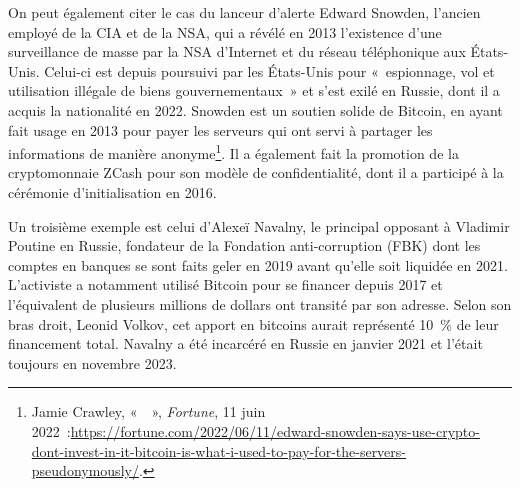 On peut également citer le cas du lanceur d'alerte Edward Snowden, l'ancien employé de la CIA et de la NSA, qui a révélé en 2013 l'existence d'une surveillance de masse par la NSA d'Internet et du réseau téléphonique aux États-Unis. Celui-ci est depuis poursuivi par les États-Unis pour «~espionnage, vol et utilisation illégale de biens gouvernementaux~» et s'est exilé en Russie, dont il a acquis la nationalité en 2022. Snowden est un soutien solide de Bitcoin, en ayant fait usage en 2013 pour payer les serveurs qui ont servi à partager les informations de manière anonyme\footnote{Jamie Crawley, «~~», \emph{Fortune}, 11 juin 2022~:\url{https://fortune.com/2022/06/11/edward-snowden-says-use-crypto-dont-invest-in-it-bitcoin-is-what-i-used-to-pay-for-the-servers-pseudonymously/}.}. Il a également fait la promotion de la cryptomonnaie ZCash pour son modèle de confidentialité, dont il a participé à la cérémonie d'initialisation en 2016.

Un troisième exemple est celui d'Alexeï Navalny, le principal opposant à Vladimir Poutine en Russie, fondateur de la Fondation anti-corruption (FBK) dont les comptes en banques se sont faits geler en 2019 avant qu'elle soit liquidée en 2021. L'activiste a notamment utilisé Bitcoin pour se financer depuis 2017 et l'équivalent de plusieurs millions de dollars ont transité par son adresse. Selon son bras droit, Leonid Volkov, cet apport en bitcoins aurait représenté 10~\% de leur financement total. Navalny a été incarcéré en Russie en janvier 2021 et l'était toujours en novembre 2023.

